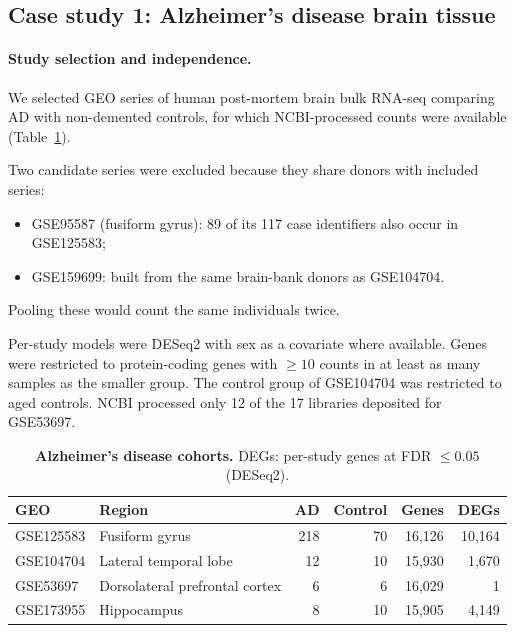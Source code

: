 \documentclass[11pt,a4paper]{article}
\begin{document}
\subsection{Case study 1: Alzheimer's disease brain tissue}

\paragraph{Study selection and independence.} We selected GEO series of human post-mortem brain bulk RNA-seq comparing AD with non-demented controls, for which NCBI-processed counts were available (Table~\ref{tab:ad}).

Two candidate series were excluded because they share donors with included series:
\begin{itemize}[noitemsep,topsep=2pt]
    \item GSE95587 (fusiform gyrus): 89 of its 117 case identifiers also occur in GSE125583;
    \item GSE159699: built from the same brain-bank donors as GSE104704.
\end{itemize}
Pooling these would count the same individuals twice.

Per-study models were DESeq2 with sex as a covariate where available. Genes were restricted to protein-coding genes with $\ge 10$ counts in at least as many samples as the smaller group. The control group of GSE104704 was restricted to aged controls. NCBI processed only 12 of the 17 libraries deposited for GSE53697.

\begin{table}[!htbp]
\centering
\small
\caption{\textbf{Alzheimer's disease cohorts.} DEGs: per-study genes at FDR $\le 0.05$ (DESeq2).}
\label{tab:ad}
\begin{tabular}{l l r r r r}
\toprule
\textbf{GEO} & \textbf{Region} & \textbf{AD} & \textbf{Control} & \textbf{Genes} & \textbf{DEGs} \\
\midrule
GSE125583 \cite{srinivasan2020gse125583} & Fusiform gyrus & 218 & 70 & 16,126 & 10,164 \\
GSE104704 \cite{nativio2018gse104704} & Lateral temporal lobe & 12 & 10 & 15,930 & 1,670 \\
GSE53697 \cite{scheckel2016gse53697} & Dorsolateral prefrontal cortex & 6 & 6 & 16,029 & 1 \\
GSE173955 \cite{gse173955ref} & Hippocampus & 8 & 10 & 15,905 & 4,149 \\
\bottomrule
\end{tabular}
\end{table}
\end{document}
